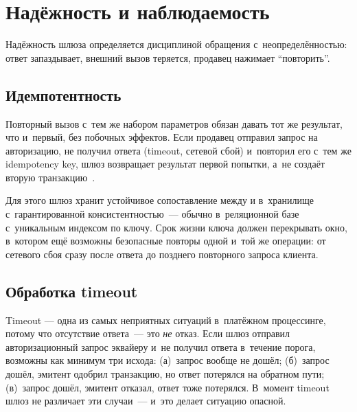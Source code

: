 \section{Надёжность и наблюдаемость}\label{sec:gw-reliability}

Надёжность шлюза определяется дисциплиной обращения
с~неопределённостью: ответ запаздывает, внешний вызов теряется,
продавец нажимает \enquote{повторить}.

\subsection*{Идемпотентность}

Повторный вызов с~тем же набором параметров обязан давать тот же
результат, что и~первый, без побочных эффектов.
Если продавец отправил запрос на авторизацию, не получил ответа
(timeout, сетевой сбой) и~повторил его с~тем же idempotency key,
шлюз возвращает результат первой попытки, а~не создаёт
вторую транзакцию~\cite{stripe-idempotency}.

Для этого шлюз хранит устойчивое сопоставление между
 и 
в~хранилище с~гарантированной консистентностью~--- обычно
в~реляционной базе с~уникальным индексом по ключу.
Срок жизни ключа должен перекрывать окно, в~котором
ещё возможны безопасные повторы одной и~той же операции:
от сетевого сбоя сразу после ответа до позднего повторного
запроса клиента.

\subsection*{Обработка timeout}

Timeout --- одна из самых неприятных ситуаций в~платёжном
процессинге, потому что отсутствие ответа~--- это \emph{не}
отказ. Если шлюз отправил авторизационный запрос эквайеру
и~не получил ответа в~течение порога, возможны как минимум
три исхода: (а)~запрос вообще не дошёл; (б)~запрос дошёл,
эмитент одобрил транзакцию, но ответ потерялся на обратном пути;
(в)~запрос дошёл, эмитент отказал, ответ тоже потерялся.
В~момент timeout шлюз не различает эти случаи~--- и~это
делает ситуацию опасной.

